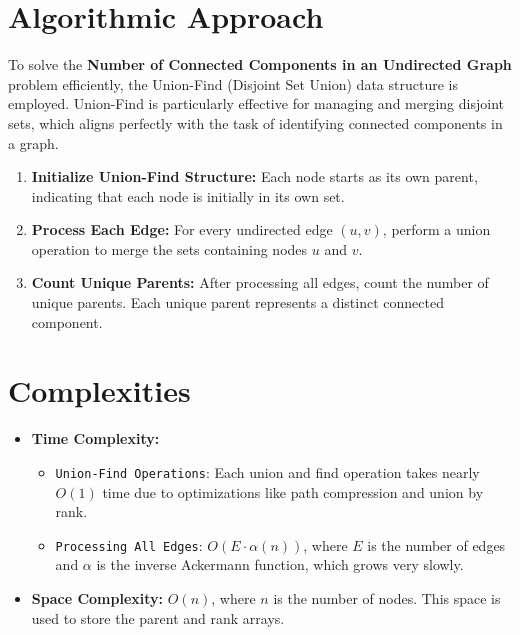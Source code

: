 \section*{Algorithmic Approach}

To solve the \textbf{Number of Connected Components in an Undirected Graph} problem efficiently, the Union-Find (Disjoint Set Union) data structure is employed. Union-Find is particularly effective for managing and merging disjoint sets, which aligns perfectly with the task of identifying connected components in a graph.

\begin{enumerate}
    \item \textbf{Initialize Union-Find Structure:}  
    Each node starts as its own parent, indicating that each node is initially in its own set.

    \item \textbf{Process Each Edge:}  
    For every undirected edge \((u, v)\), perform a union operation to merge the sets containing nodes \(u\) and \(v\).

    \item \textbf{Count Unique Parents:}  
    After processing all edges, count the number of unique parents. Each unique parent represents a distinct connected component.
\end{enumerate}


\section*{Complexities}

\begin{itemize}
    \item \textbf{Time Complexity:}
    \begin{itemize}
        \item \texttt{Union-Find Operations}: Each union and find operation takes nearly \(O(1)\) time due to optimizations like path compression and union by rank.
        \item \texttt{Processing All Edges}: \(O(E \cdot \alpha(n))\), where \(E\) is the number of edges and \(\alpha\) is the inverse Ackermann function, which grows very slowly.
    \end{itemize}
    \item \textbf{Space Complexity:} \(O(n)\), where \(n\) is the number of nodes. This space is used to store the parent and rank arrays.
\end{itemize}


